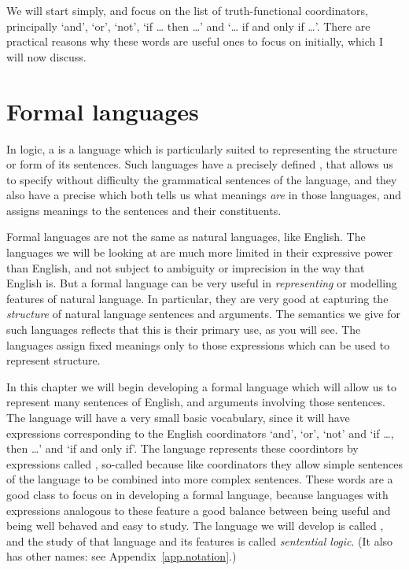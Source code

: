 We will start simply, and focus on the list of truth-functional coordinators, principally `and', `or', `not', `if … then …' and `… if and only if …'. There are practical reasons why these words are useful ones to focus on initially, which I will now discuss.

\section{Formal languages}

In logic, a  is a language which is particularly suited to representing the structure or form of its sentences. Such languages have a precisely defined , that allows us to specify without difficulty the grammatical sentences of the language, and they also have a precise  which both tells us what meanings \emph{are} in those languages, and assigns meanings to the sentences and their constituents. 

Formal languages are not the same as natural languages, like English. The languages we will be looking at are much more limited in their expressive power than English, and not subject to ambiguity or imprecision in the way that English is.  But a formal language can be very useful in \emph{representing} or modelling features of natural language. In particular, they are very good at capturing the \emph{structure} of natural language sentences and arguments. The semantics we give for such languages reflects that this is their primary use, as you will see. The languages assign fixed meanings only to those expressions which can be used to represent structure.

In this chapter we will begin developing a formal language which will allow us to represent many sentences of English, and arguments involving those sentences. The language will have a very small basic vocabulary, since it will have expressions corresponding to the English coordinators `and', `or', `not' and `if …, then …' and `if and only if'. The language represents these coordintors by expressions called , so-called because like coordinators they allow simple sentences of the language to be combined into more complex sentences. These words are a good class to focus on in developing a formal language, because languages with expressions analogous to these feature a good balance between being useful and being well behaved and easy to study. The language we will develop is called \TFL, and the study of that language and its features is called \emph{sentential logic}. (It also has other names: see Appendix~\ref{app.notation}.) 


